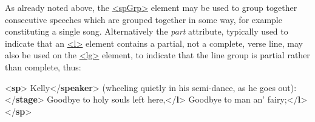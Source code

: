 As already noted above, the \hyperref[TEI.spGrp]{<spGrp>} element may be used to group together consecutive speeches which are grouped together in some way, for example constituting a single song. Alternatively the {\itshape part} attribute, typically used to indicate that an \hyperref[TEI.l]{<l>} element contains a partial, not a complete, verse line, may also be used on the \hyperref[TEI.lg]{<lg>} element, to indicate that the line group is partial rather than complete, thus: \par\bgroup{}\exampleFont \begin{shaded}\noindent\mbox{}{<\textbf{sp}>}\mbox{}\newline 
{}Kelly{</\textbf{speaker}>}\mbox{}\newline 
{}(wheeling quietly in his semi-dance,\mbox{}\newline 
\hspace*{1em}\hspace*{1em} as he goes out):{</\textbf{stage}>}\mbox{}\newline 
{}\mbox{}\newline 
\hspace*{1em}Goodbye to holy souls left here,{</\textbf{l}>}\mbox{}\newline 
\hspace*{1em}Goodbye to man an' fairy;{</\textbf{l}>}\mbox{}\newline 
{}\mbox{}\newline 
{</\textbf{sp}>}\mbox{}\newline 

\end{shaded}
